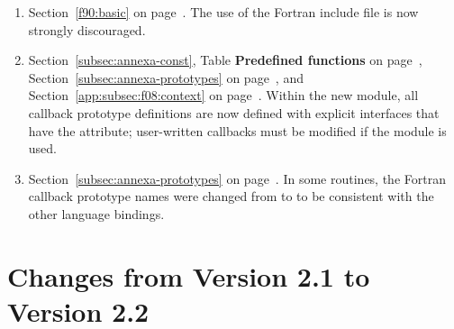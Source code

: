 \begin{enumerate}
\item 
Section~\ref{f90:basic} on page~\pageref{f90:basic}.
\newline 
The use of the  Fortran include file is now strongly discouraged. 
 
\item 
Section~\ref{subsec:annexa-const},
Table \textbf{Predefined functions} on page~\pageref{table:predefined-functions},
Section~\ref{subsec:annexa-prototypes} on page~\pageref{subsec:annexa-prototypes},
and Section~\ref{app:subsec:f08:context} on page~\pageref{app:subsec:f08:context}.
\newline 
Within the new  module, all callback prototype definitions are now
defined with explicit interfaces  that have the  
attribute; user-written callbacks must be modified if the  module is used.
 
\item 
Section~\ref{subsec:annexa-prototypes} on page~\pageref{subsec:annexa-prototypes}.
\newline 
In some routines, the Fortran callback prototype names were changed 
from  to  to be 
consistent with the other language bindings.
 
\end{enumerate}


\section{Changes from Version 2.1 to Version 2.2}

%
%

